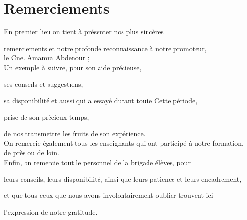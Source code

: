\chapter*{Remerciements}
\vspace*{1.5cm}

\begin{center}
    
	
		En premier lieu on tient à présenter nos plus sincères
		
		remerciements et notre profonde reconnaissance à notre  promoteur, \\
		
		le Cne. Amamra Abdenour ; \\
		
		Un exemple à suivre, pour son aide précieuse,
		
		ses conseils et suggestions, 
		
		sa disponibilité et aussi qui a essayé durant toute Cette période,
		
		prise de son précieux temps, 
		
		de nos transmettre les fruits de son
		expérience.\\
		
		On remercie également tous les enseignants qui ont participé à notre
		formation, de près ou de loin.\\
		
		Enfin, on remercie tout le personnel de la brigade élèves, pour
		
		leurs conseils, leurs disponibilité, ainsi que leurs patience et leurs encadrement,
		
		et que tous ceux que nous avons involontairement oublier trouvent ici
		
		l’expression de notre gratitude.

\end{center}

